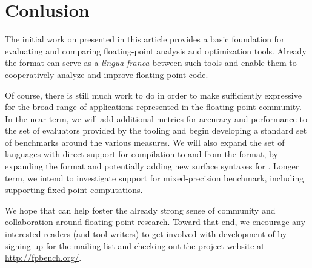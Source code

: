 \documentclass[main.tex]{subfiles}
\begin{document}
\section{Conlusion}
\label{sec:conclusion}

The initial work on \name presented in this article provides a basic
foundation for evaluating and comparing floating-point analysis and
optimization tools.  Already the \name format can serve as a
\textit{lingua franca} between such tools and enable them to
cooperatively analyze and improve floating-point code.

Of course, there is still much work to do in order to make \name
sufficiently expressive for the broad range of applications
represented in the floating-point community.  In the near term, we
will add additional metrics for accuracy and performance to the set of
evaluators provided by the \name tooling and begin developing a
standard set of benchmarks around the various measures.  We will also
expand the set of languages with direct support for compilation to and
from the \name format, by expanding the \surface format and
potentially adding new surface syntaxes for \name. Longer term, we
intend to investigate support for mixed-precision benchmark, including
supporting fixed-point computations.

We hope that \name can help foster the already strong sense of
community and collaboration around floating-point research.  Toward
that end, we encourage any interested readers (and tool writers) to
get involved with development of \name by signing up for the mailing
list and checking out the project website at
\url{http://fpbench.org/}.
\end{document}
